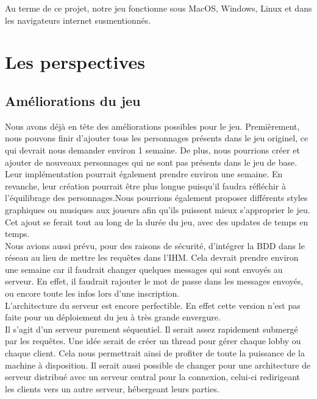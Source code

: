\documentclass[a4paper,11pt]{article}
\begin{document}
    Au terme de ce projet, notre jeu fonctionne sous MacOS, Windows, Linux et dans les navigateurs internet susmentionnés.  \\
 
	
\section{Les perspectives}

\subsection{Améliorations du jeu}

    Nous avons déjà en tête des améliorations possibles pour le jeu. Premièrement, nous pouvons finir d’ajouter tous les personnages présents dans le jeu originel, ce qui devrait nous demander environ 1 semaine. De plus, nous pourrions créer et ajouter de nouveaux personnages qui ne sont pas présents dans le jeu de base. 
    Leur implémentation pourrait également prendre environ une semaine. En revanche, leur création pourrait être plus longue puisqu’il faudra réfléchir à l'équilibrage des personnages.Nous pourrions également proposer différents styles graphiques ou musiques aux joueurs afin qu’ils puissent mieux s’approprier le jeu. Cet ajout se ferait tout au long de la durée du jeu, avec des updates de temps en temps. \\

	Nous avions aussi prévu, pour des raisons de sécurité, d'intégrer la BDD dans le réseau au lieu de mettre les requêtes dans l’IHM. Cela devrait prendre environ une semaine car il faudrait changer quelques messages qui sont envoyés au serveur. En effet, il faudrait rajouter le mot de passe dans les messages envoyés, ou encore toute les infos lors d’une inscription. \\

    L’architecture du serveur est encore perfectible. En effet cette version n’est pas faite pour un déploiement du jeu à très grande envergure.  \\
    Il s’agit d’un serveur purement séquentiel. Il serait assez rapidement submergé par les requêtes. Une idée serait de créer un thread pour gérer chaque lobby ou chaque client. Cela nous permettrait ainsi de profiter de toute la puissance de la machine à disposition. Il serait aussi possible de changer pour une architecture de serveur distribué avec un serveur central pour la connexion, celui-ci redirigeant les clients vers un autre serveur, hébergeant leurs parties. \\
\end{document}
